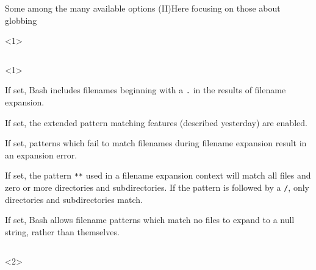 \begin{frame}[fragile]{Some among the many available options (II)}{Here focusing on those about globbing}
    \begin{onlyenv}<1>
        \vspace{-6mm}
        \begin{columns}
            \begin{column}{\dimexpr\paperwidth-10mm}
                \begin{onlyenv}<1>
                    \begin{description}
                        \setlength{\itemsep}{3mm}
                        \item[\PB{\texttt{dotglob}}]
                            If set, Bash includes filenames beginning with a \texttt{.} in the results of filename expansion.\\[-1mm]
                        \item[\PB{\texttt{extglob}}]
                            If set, the extended pattern matching features (described yesterday) are enabled.
                        \item[\PB{\texttt{failglob}}]
                            If set, patterns which fail to match filenames during filename expansion result in an expansion error.
                        \item[\PB{\texttt{globstar}}]
                            If set, the pattern \texttt{**} used in a filename expansion context will match all files and zero or more directories and subdirectories.
                            If the pattern is followed by a \texttt{/}, only directories and subdirectories match. 
                        \item[\PB{\texttt{nullglob}}]
                            If set, Bash allows filename patterns which match no files to expand to a null string, rather than themselves.
                    \end{description}
                \end{onlyenv}
            \end{column}
        \end{columns}
    \end{onlyenv}
    \begin{onlyenv}<2>
        \begin{lstlisting}[style=myBash]

\end{lstlisting}
\end{onlyenv}
\end{frame}
